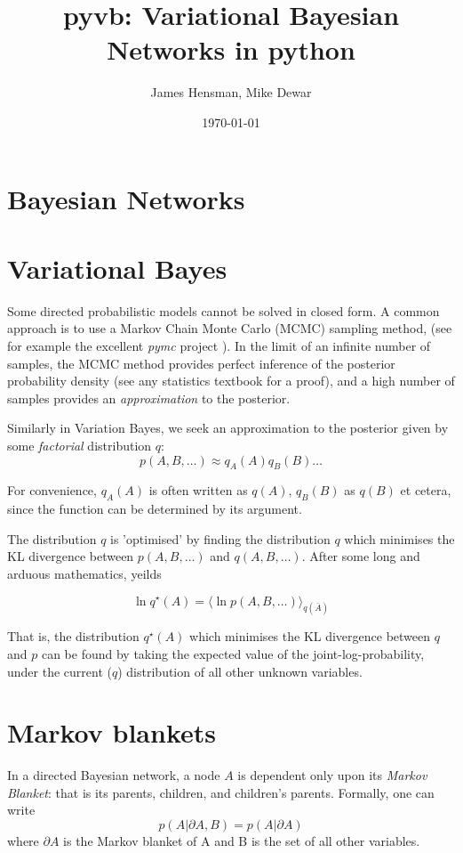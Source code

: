 \documentclass{article}
\title{pyvb: Variational Bayesian Networks in python}
\author{James Hensman, Mike Dewar}
\date{\today}
\newcommand{\qs}{q^\star}
\newcommand{\<}{\langle}
\renewcommand{\>}{\rangle}
\begin{document}
\maketitle

\section{Bayesian Networks}

\section{Variational Bayes}
Some directed probabilistic models cannot be solved in closed form. A common approach is to use a Markov Chain Monte Carlo (MCMC) sampling method, (see for example the excellent {\em pymc} project \cite{pymc}).  In the limit of an infinite number of samples, the MCMC method provides perfect inference of the posterior probability density (see any statistics textbook for a proof), and a high number of samples provides an {\em approximation} to the posterior.  

Similarly in Variation Bayes, we seek an approximation to the posterior given by some {\em factorial} distribution $q$:
\begin{equation}
p(A,B,\ldots) \approx q_A(A) q_B(B) \ldots
\end{equation}

For convenience, $q_A(A)$ is often written as $q(A)$, $q_B(B)$ as $q(B)$ et cetera, since the function can be determined by its argument. 

The distribution $q$ is 'optimised' by finding the distribution $q$ which minimises the KL divergence between $p(A,B,\ldots)$ and $q(A,B,\ldots)$.  After some long and arduous mathematics, \citet{Bishop2006prm} yeilds

\begin{equation}
\ln \qs(A) = \< \ln p(A,B,\ldots)\>_{q(\bar A)}
\label{eq:basic_VB_update}
\end{equation}

That is, the distribution $\qs(A)$ which minimises the KL divergence between $q$ and $p$ can be found by taking the expected value of the joint-log-probability, under the current ($q$) distribution of all other unknown variables. 

\section{Markov blankets}
In a directed Bayesian network, a node $A$ is dependent only upon its {\em Markov Blanket}: that is its parents, children, and children's parents. Formally, one can write
\begin{equation}
p(A|\partial A,B) = p(A | \partial A)
\end{equation}
where $\partial A$ is the Markov blanket of A and B is the set of all other variables.   
\end{document}
